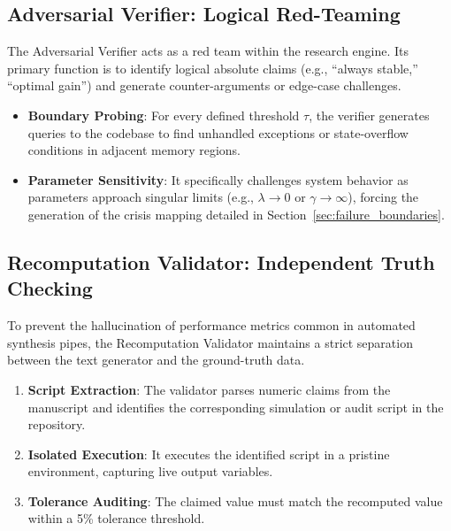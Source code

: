 \documentclass{article}
\begin{document}
\subsection{Adversarial Verifier: Logical Red-Teaming}
The Adversarial Verifier acts as a red team within the research engine. Its primary function is to identify logical absolute claims (e.g., ``always stable,'' ``optimal gain'') and generate counter-arguments or edge-case challenges.
\begin{itemize}
    \item \textbf{Boundary Probing}: For every defined threshold $\tau$, the verifier generates queries to the codebase to find unhandled exceptions or state-overflow conditions in adjacent memory regions.
    \item \textbf{Parameter Sensitivity}: It specifically challenges system behavior as parameters approach singular limits (e.g., $\lambda \to 0$ or $\gamma \to \infty$), forcing the generation of the crisis mapping detailed in Section~\ref{sec:failure_boundaries}.
\end{itemize}

\subsection{Recomputation Validator: Independent Truth Checking}
To prevent the hallucination of performance metrics common in automated synthesis pipes, the Recomputation Validator maintains a strict separation between the text generator and the ground-truth data.
\begin{enumerate}
    \item \textbf{Script Extraction}: The validator parses numeric claims from the manuscript and identifies the corresponding simulation or audit script in the repository.
    \item \textbf{Isolated Execution}: It executes the identified script in a pristine environment, capturing live output variables.
    \item \textbf{Tolerance Auditing}: The claimed value must match the recomputed value within a 5\% tolerance threshold.
\end{enumerate}
\end{document}
